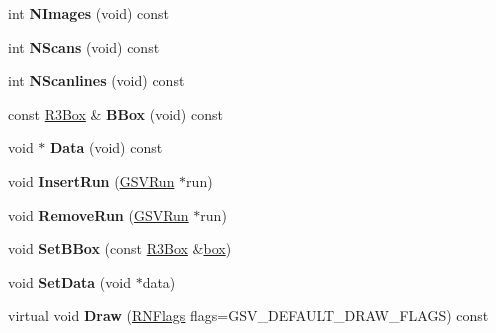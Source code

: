 \begin{DoxyCompactItemize}
\item 
int {\bfseries N\+Images} (void) const \hypertarget{class_g_s_v_scene_a092b821640cde5196fd2afd08ac9abb3}{}\label{class_g_s_v_scene_a092b821640cde5196fd2afd08ac9abb3}

\item 
int {\bfseries N\+Scans} (void) const \hypertarget{class_g_s_v_scene_a3e3d3afe94aadf162ee6fea8b4d38b24}{}\label{class_g_s_v_scene_a3e3d3afe94aadf162ee6fea8b4d38b24}

\item 
int {\bfseries N\+Scanlines} (void) const \hypertarget{class_g_s_v_scene_a1fb5c27a8973c7e5c8f41cdd8936dc03}{}\label{class_g_s_v_scene_a1fb5c27a8973c7e5c8f41cdd8936dc03}

\item 
const \hyperlink{class_r3_box}{R3\+Box} \& {\bfseries B\+Box} (void) const \hypertarget{class_g_s_v_scene_a965900414fd13877ad91b53af52639e1}{}\label{class_g_s_v_scene_a965900414fd13877ad91b53af52639e1}

\item 
void $\ast$ {\bfseries Data} (void) const \hypertarget{class_g_s_v_scene_a7ab8a2152dbd20dc94804e993ba574d1}{}\label{class_g_s_v_scene_a7ab8a2152dbd20dc94804e993ba574d1}

\item 
void {\bfseries Insert\+Run} (\hyperlink{class_g_s_v_run}{G\+S\+V\+Run} $\ast$run)\hypertarget{class_g_s_v_scene_a710f7b98e2d68368b92220bdb4a1533e}{}\label{class_g_s_v_scene_a710f7b98e2d68368b92220bdb4a1533e}

\item 
void {\bfseries Remove\+Run} (\hyperlink{class_g_s_v_run}{G\+S\+V\+Run} $\ast$run)\hypertarget{class_g_s_v_scene_a88ea7c2793b24fa56bf04bd776c3d764}{}\label{class_g_s_v_scene_a88ea7c2793b24fa56bf04bd776c3d764}

\item 
void {\bfseries Set\+B\+Box} (const \hyperlink{class_r3_box}{R3\+Box} \&\hyperlink{structbox}{box})\hypertarget{class_g_s_v_scene_ae1d51b0629f9eaa6f87094fd55870a40}{}\label{class_g_s_v_scene_ae1d51b0629f9eaa6f87094fd55870a40}

\item 
void {\bfseries Set\+Data} (void $\ast$data)\hypertarget{class_g_s_v_scene_a645e2f45d7ff36d68050dc563f4d06c4}{}\label{class_g_s_v_scene_a645e2f45d7ff36d68050dc563f4d06c4}

\item 
virtual void {\bfseries Draw} (\hyperlink{class_r_n_flags}{R\+N\+Flags} flags=G\+S\+V\+\_\+\+D\+E\+F\+A\+U\+L\+T\+\_\+\+D\+R\+A\+W\+\_\+\+F\+L\+A\+GS) const \hypertarget{class_g_s_v_scene_a5ed844460a6f26b8f5cba9701b817f9f}{}\label{class_g_s_v_scene_a5ed844460a6f26b8f5cba9701b817f9f}


\end{DoxyCompactItemize}
